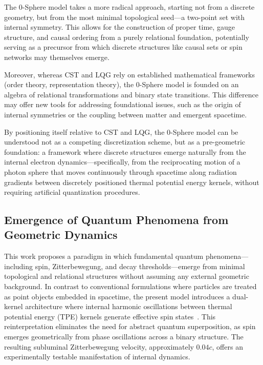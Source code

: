 \documentclass[%
 reprint,
 amsmath,amssymb,
 aps,
]{revtex4-1}
\numberwithin{equation}{section}%
\begin{document}
The 0-Sphere model takes a more radical approach, starting not from a discrete geometry, but from the most minimal topological seed—a two-point set with internal symmetry. This allows for the construction of proper time, gauge structure, and causal ordering from a purely relational foundation, potentially serving as a precursor from which discrete structures like causal sets or spin networks may themselves emerge.

Moreover, whereas CST and LQG rely on established mathematical frameworks (order theory, representation theory), the 0-Sphere model is founded on an algebra of relational transformations and binary state transitions. This difference may offer new tools for addressing foundational issues, such as the origin of internal symmetries or the coupling between matter and emergent spacetime.

By positioning itself relative to CST and LQG, the 0-Sphere model can be understood not as a competing discretization scheme, but as a pre-geometric foundation: a framework where discrete structures emerge naturally from the internal electron dynamics—specifically, from the reciprocating motion of a photon sphere that moves continuously through spacetime along radiation gradients between discretely positioned thermal potential energy kernels, without requiring artificial quantization procedures.


\subsection{Emergence of Quantum Phenomena from Geometric Dynamics}
\label{subsec:quantum_emergence}

This work proposes a paradigm in which fundamental quantum phenomena—including spin, Zitterbewegung, and decay thresholds—emerge from minimal topological and relational structures without assuming any external geometric background. In contrast to conventional formulations where particles are treated as point objects embedded in spacetime, the present model introduces a dual-kernel architecture where internal harmonic oscillations between thermal potential energy (TPE) kernels generate effective spin states~\cite{hanamura2309.0047}. This reinterpretation eliminates the need for abstract quantum superposition, as spin emerges geometrically from phase oscillations across a binary structure. The resulting subluminal Zitterbewegung velocity, approximately $0.04c$, offers an experimentally testable manifestation of internal dynamics.
\end{document}
